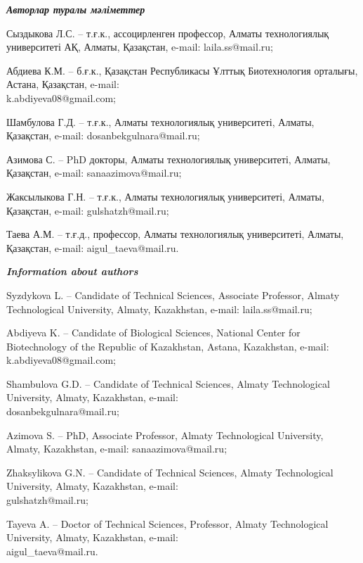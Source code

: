 \begin{authorinfo}
\emph{{\bfseries Авторлар туралы мәліметтер}}  

Сыздыкова Л.С. – т.ғ.к., ассоцирленген профессор, Алматы технологиялық
университеті АҚ, Алматы, Қазақстан, e-mail: laila.ss@mail.ru;

Абдиева К.М. – б.ғ.к., Қазақстан Республикасы Ұлттық Биотехнология
орталығы, Астана, Қазақстан, e-mail: \\k.abdiyeva08@gmail.com;

Шамбулова Г.Д. – т.ғ.к., Алматы технологиялық университеті, Алматы,
Қазақстан, e-mail: dosanbekgulnara@mail.ru;

Азимова С. – PhD докторы, Алматы технологиялық университеті, Алматы,
Қазақстан, e-mail: sanaazimova@mail.ru;

Жаксылыкова Г.Н. – т.ғ.к., Алматы технологиялық университеті, Алматы,
Қазақстан, e-mail: gulshatzh@mail.ru;

Таева А.М. – т.ғ.д., профессор, Алматы технологиялық университеті,
Алматы, Қазақстан, e-mail: aigul\_taeva@mail.ru.

\emph{{\bfseries Information about authors}}  

Syzdykova L. – Candidate of Technical Sciences, Associate Professor,
Almaty Technological University, Almaty, Kazakhstan, e-mail:
laila.ss@mail.ru;

Abdiyeva K. – Candidate of Biological Sciences, National Center for
Biotechnology of the Republic of Kazakhstan, Astana, Kazakhstan,
e-mail: k.abdiyeva08@gmail.com;

Shambulova G.D. – Candidate of Technical Sciences, Almaty
Technological University, Almaty, Kazakhstan, e-mail:\\
dosanbekgulnara@mail.ru;

Azimova S. – PhD, Associate Professor, Almaty Technological
University, Almaty, Kazakhstan, e-mail: sanaazimova@mail.ru;

Zhaksylikova G.N. – Candidate of Technical Sciences, Almaty
Technological University, Almaty, Kazakhstan, e-mail:\\
gulshatzh@mail.ru;

Tayeva A. – Doctor of Technical Sciences, Professor, Almaty
Technological University, Almaty, Kazakhstan, e-mail:\\
aigul\_taeva@mail.ru.
\end{authorinfo}
